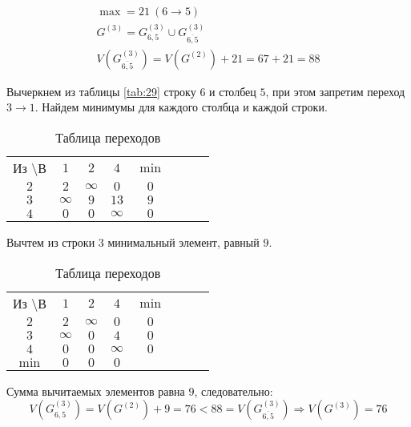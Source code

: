 \vspace{-1cm}
\begin{gather*}
\max = 21\ (6 \rightarrow 5) \\
G^{(3)} = G_{6,5}^{(3)} \cup G_{\overline{6,5}}^{(3)} \\
V(G_{\overline{6,5}}^{(3)}) = V(G^{(2)}) + 21 = 67 + 21 = 88
\end{gather*}

Вычеркнем из таблицы \ref{tab:29} строку $6$ и столбец $5$, при этом запретим переход $3 \rightarrow 1$. Найдем минимумы для каждого столбца и каждой строки.

\begin{table}[H]
\begin{center}
	\def\tabcolsep{15pt}
	\caption{Таблица переходов}
	\label{tab:31}
	\begin{tabular}{|c||c|c|c|c|c|c|c|}
		\hline
		Из \textbackslash В & $1$ & $2$ & $4$ & $\min$ \\
		\hhline{|=#=|=|=|=|}
		$2$ & $2$ & $\infty$ & $0$ & $0$ \\
		\hline
		$3$ & $\infty$ & $9$ & $13$ & $9$  \\ 
		\hline
		$4$ & $0$ & $0$ & $\infty$ & $0$  \\
		\hline
	\end{tabular}
\end{center}
\end{table}

Вычтем из строки $3$ минимальный элемент, равный $9$.

\begin{table}[H]
\begin{center}
	\def\tabcolsep{15pt}
	\caption{Таблица переходов}
	\label{tab:32}
	\begin{tabular}{|c||c|c|c|c|c|c|c|}
		\hline
		Из \textbackslash В & $1$ & $2$ & $4$ & $\min$ \\
		\hhline{|=#=|=|=|=|}
		$2$ & $2$ & $\infty$ & $0$ & $0$ \\
		\hline
		$3$ & $\infty$ & $0$ & $4$ & $0$  \\ 
		\hline
		$4$ & $0$ & $0$ & $\infty$ & $0$  \\
		\hhline{|=#=|=|=|=|}
		$\min$ & $0$ & $0$ & $0$ & \\ 
		\hline
	\end{tabular}
\end{center}
\end{table}

Сумма вычитаемых элементов равна $9$, следовательно:
\begin{equation*}
V(G_{6,5}^{(3)}) = V(G^{(2)}) + 9 = 76 < 88 = V(G_{\overline{6,5}}^{(3)})\Rightarrow V(G^{(3)}) = 76
\end{equation*}

